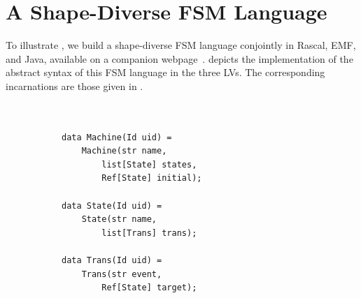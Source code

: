 \section{A Shape-Diverse FSM Language}
\label{sec:eval}

To illustrate \prism, we build a shape-diverse FSM language conjointly in Rascal, EMF, and Java, available on a companion webpage~\cite{prism}.
 depicts the implementation of the abstract syntax of this FSM language in the three LVs.
The corresponding incarnations are those given in .

\begin{figure}[bt]
	\centering
	\begin{subfigure}[t]{.3\columnwidth}
		\vskip 0pt
		\begin{lstlisting}[label=lst:fsm-adt, language=Rascal, numbers=none, xleftmargin=0pt, tabsize=1, aboveskip=0pt, belowskip=0pt, abovecaptionskip=0pt, showlines=true]


data Machine(Id uid) =
	Machine(str name,
		list[State] states,
		Ref[State] initial);

data State(Id uid) =
	State(str name,
		list[Trans] trans);

data Trans(Id uid) =
	Trans(str event,
		Ref[State] target);



\end{lstlisting}
\end{subfigure}
\end{figure}
